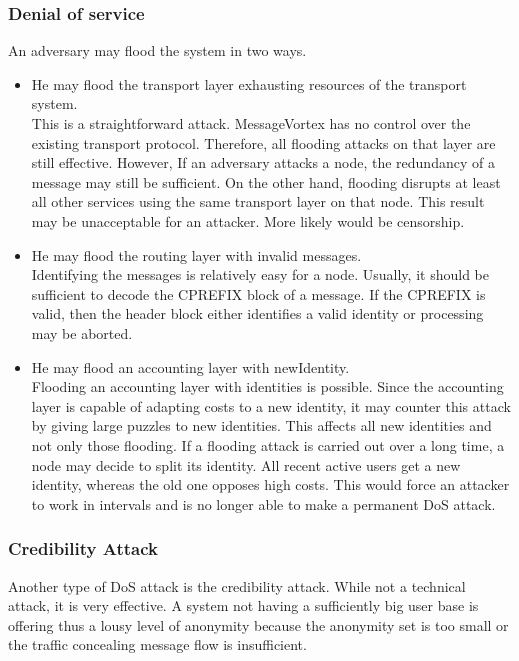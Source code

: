 \subsubsection{Denial of service}
An adversary may flood the system in two ways.
\begin{itemize}
	\item He may flood the transport layer exhausting resources of the transport system.\\
	This is a straightforward attack. MessageVortex has no control over the existing transport protocol. Therefore, all flooding attacks on that layer are still effective. However, If an adversary attacks a node, the redundancy of a message may still be sufficient. On the other hand, flooding disrupts at least all other services using the same transport layer on that node. This result may be unacceptable for an attacker. More likely would be censorship.
	\item He may flood the routing layer with invalid messages.\\ 
	Identifying the messages is relatively easy for a node. Usually, it should be sufficient to decode the CPREFIX block of a message. If the CPREFIX is valid, then the header block either identifies a valid identity or processing may be aborted. 
	\item He may flood an accounting layer with newIdentity.\\
	Flooding an accounting layer with identities is possible. Since the accounting layer is capable of adapting costs to a new identity, it may counter this attack by giving large puzzles to new identities. This affects all new identities and not only those flooding. If a flooding attack is carried out over a long time, a node may decide to split its identity. All recent active users get a new identity, whereas the old one opposes high costs. This would force an attacker to work in intervals and is no longer able to make a permanent DoS attack.
\end{itemize}

\subsubsection{Credibility Attack}
Another type of DoS attack is the credibility attack. While not a technical attack, it is very effective. A system not having a sufficiently big user base is offering thus a lousy level of anonymity because the anonymity set is too small or the traffic concealing message flow is insufficient. 

